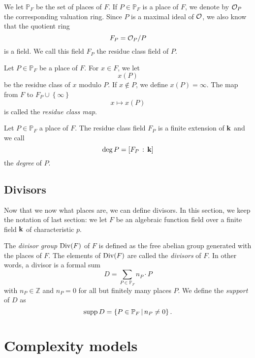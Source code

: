 %

We let $\mathbb{P}_F$ be the set of places of $F$. If $P\in\mathbb{P}_F$ is a
place of $F$, we denote by $\mathcal{O}_P$ the corresponding valuation ring. Since $P$
is a maximal ideal of $\mathcal{O}$, we also know that the quotient ring
\[
  F_P = \mathcal{O}_P/P
\]
is a field. We call this field $F_P$ the residue class field of $P$.
\begin{defi}
Let $P\in\mathbb{P}_F$ be a place of $F$. For $x\in F$, we let 
\[
  x(P)
\]
be the residue class of $x$ modulo $P$. If $x\notin P$, we define $x(P)=\infty$.
The map from $F$ to $F_P\cup\left\{ \infty \right\}$
\[
  x\mapsto x(P)
\]
is called the \emph{residue class map}.
\end{defi}
\begin{defi}
  Let $P\in\mathbb{P}_F$ a place of $F$. The residue class field $F_P$ is a
  finite extension of $\mathbf{k}$ and we call
  \[
    \deg P = \left[ F_P\,:\,\mathbf{k} \right]
  \]
  the \emph{degree} of $P$.
\end{defi}

\subsection{Divisors}

Now that we now what places are, we can define divisors. In this section, we
keep the notation of last section: we let $F$ be an algebraic function field
over a finite field $\mathbf{k}$ of characteristic $p$.
\begin{defi}[Divisor]
  The \emph{divisor group} $\operatorname{Div}(F)$ of $F$ is defined as the free abelian group generated
  with the places of $F$. The elements of $\operatorname{Div}(F)$ are called the
  \emph{divisors} of $F$. In other words, a divisor is a formal sum
  \[
    D = \sum_{P\in\mathbb{P}_F} n_P\cdot P
  \]
  with $n_P\in\mathbb{Z}$ and $n_P=0$ for all but finitely many places $P$.
  We define the \emph{support} of $D$ as
  \[
    \operatorname{supp} D = \left\{ P\in\mathbb{P}_F\,|\,n_P\neq 0 \right\}.
  \]
\end{defi}


\section{Complexity models}
\label{sec:complexity-models}

